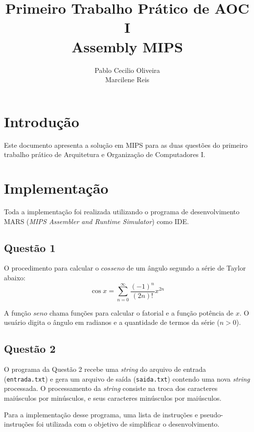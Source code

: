 \documentclass[12pt,a4paper]{article}
\author{Pablo Cecilio Oliveira\\
Marcilene Reis}
\title{Primeiro Trabalho Prático de AOC I\\
Assembly MIPS}
\date{}
\numberwithin{figure}{subsection}
\numberwithin{table}{subsection}
\begin{document}
\maketitle

\section{Introdução}

Este documento apresenta a solução em MIPS para as duas questões do primeiro trabalho prático de Arquitetura e Organização de Computadores I.

\section{Implementação}

Toda a implementação foi realizada utilizando o programa de desenvolvimento MARS (\textit{MIPS Assembler and Runtime Simulator}) como IDE.

\subsection{Questão 1}

O procedimento para calcular o $cosseno$ de um ângulo segundo a série de Taylor abaixo:
\[ \cos x = \sum_{n=0}^{\infty} \frac{(-1)^n}{(2n)!} x^{2n} \]

A função $seno$ chama funções para calcular o fatorial e a função potência de $x$. O usuário digita o ângulo em radianos e a quantidade de termos da série ($n>0$).

\subsection{Questão 2}

O programa da Questão 2 recebe uma \textit{string} do arquivo de entrada (\texttt{entrada.txt}) e gera um arquivo de saída (\texttt{saida.txt}) contendo uma nova \textit{string} processada. O processamento da \textit{string} consiste na troca dos caracteres maiúsculos por minúsculos, e seus caracteres minúsculos por maiúsculos.

Para a implementação desse programa, uma lista de instruções e pseudo-instruções foi utilizada com o objetivo de simplificar o desenvolvimento.
\end{document}
